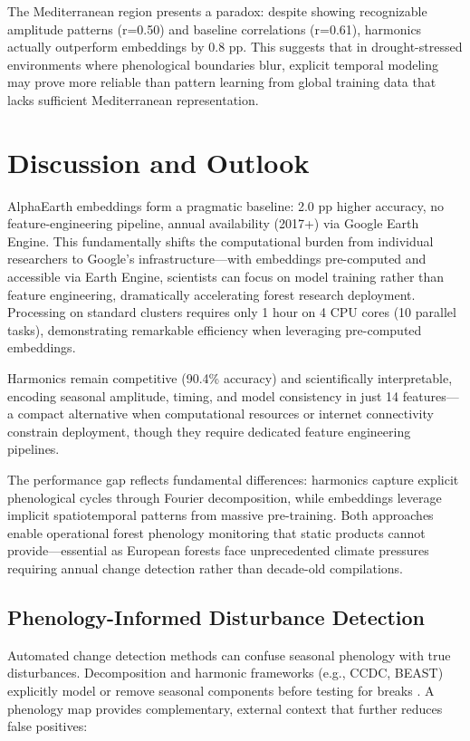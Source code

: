 \documentclass[utf8]{FrontiersinHarvard}
\begin{document}
The Mediterranean region presents a paradox: despite showing recognizable amplitude patterns (r=0.50) and baseline correlations (r=0.61), harmonics actually outperform embeddings by 0.8 pp. This suggests that in drought-stressed environments where phenological boundaries blur, explicit temporal modeling may prove more reliable than pattern learning from global training data that lacks sufficient Mediterranean representation.

\section{Discussion and Outlook}

AlphaEarth embeddings form a pragmatic baseline: 2.0 pp higher accuracy, no feature-engineering pipeline, annual availability (2017+) via Google Earth Engine. This fundamentally shifts the computational burden from individual researchers to Google's infrastructure—with embeddings pre-computed and accessible via Earth Engine, scientists can focus on model training rather than feature engineering, dramatically accelerating forest research deployment. Processing on standard clusters requires only 1 hour on 4 CPU cores (10 parallel tasks), demonstrating remarkable efficiency when leveraging pre-computed embeddings.

Harmonics remain competitive (90.4\% accuracy) and scientifically interpretable, encoding seasonal amplitude, timing, and model consistency in just 14 features—a compact alternative when computational resources or internet connectivity constrain deployment, though they require dedicated feature engineering pipelines.

The performance gap reflects fundamental differences: harmonics capture explicit phenological cycles through Fourier decomposition, while embeddings leverage implicit spatiotemporal patterns from massive pre-training. Both approaches enable operational forest phenology monitoring that static products cannot provide—essential as European forests face unprecedented climate pressures requiring annual change detection rather than decade-old compilations.

\subsection{Phenology-Informed Disturbance Detection}
Automated change detection methods can confuse seasonal phenology with true disturbances. Decomposition and harmonic frameworks (e.g., CCDC, BEAST) explicitly model or remove seasonal components before testing for breaks \citep{Zhu2014,Zhao2019}. A phenology map provides complementary, external context that further reduces false positives:
\end{document}
